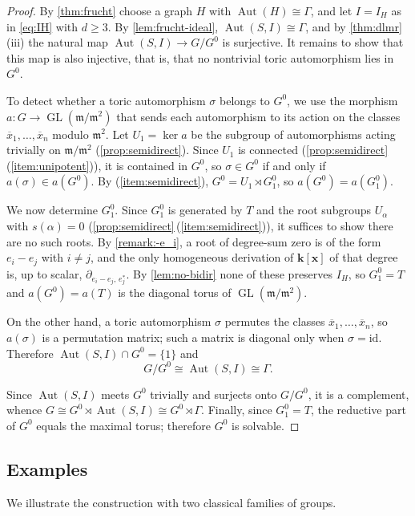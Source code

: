 \documentclass[11pt,letterpaper,reqno]{amsart}
\theoremstyle{remark}
\theoremstyle{definition}
\def\M{\mathfrak{m}}
\def\XX{\mathbf{x}}
\newcommand{\KK}[0]{\ensuremath{\mathbf{k}}}
\newcommand{\Aut}[0]{\ensuremath{\operatorname{Aut}}}
\newcommand{\GL}[0]{\ensuremath{\operatorname{GL}}}
\begin{document}
\begin{proof}
By \cref{thm:frucht} choose a graph $H$ with $\Aut(H)\cong\Gamma$, and let
$I=I_H$ as in \eqref{eq:IH} with $d\geq3$. By \cref{lem:frucht-ideal},
$\Aut(S,I)\cong\Gamma$, and by \cref{thm:dlmr}\,(iii) the natural map
$\Aut(S,I)\to G/G^0$ is surjective. It remains to show that this map is also
injective, that is, that no nontrivial toric automorphism lies in $G^0$.

To detect whether a toric automorphism $\sigma$ belongs to $G^0$, we use the
morphism $a\colon G\to\GL(\M/\M^2)$ that sends each automorphism to its action
on the classes $\overline{x}_1,\dots,\overline{x}_n$ modulo $\M^2$. Let
$U_1 = \ker a$ be the subgroup of automorphisms acting trivially on $\M/\M^2$
(\cref{prop:semidirect}). Since $U_1$ is connected
(\cref{prop:semidirect}\,(\ref{item:unipotent})), it is contained in $G^0$, so
$\sigma\in G^0$ if and only if $a(\sigma)\in a(G^0)$. By
(\ref{item:semidirect}), $G^0 = U_1 \rtimes G_1^0$, so $a(G^0) = a(G_1^0)$.

We now determine $G_1^0$. Since $G_1^0$ is generated by $T$ and the root
subgroups $U_\alpha$ with $s(\alpha)=0$
(\cref{prop:semidirect}\,(\ref{item:semidirect})), it suffices to show there are
no such roots. By \cref{remark:-e_i}, a root of degree-sum zero is of the form $e_i-e_j$ with $i\neq j$, and the only homogeneous derivation of $\KK[\XX]$ of that degree is, up to scalar, $\partial_{e_i-e_j,\,e_j^*}$. By \cref{lem:no-bidir} none of these
preserves $I_H$, so $G_1^0 = T$ and $a(G^0) = a(T)$ is the diagonal torus of
$\GL(\M/\M^2)$.

On the other hand, a toric automorphism $\sigma$ permutes the classes
$\overline{x}_1,\dots,\overline{x}_n$, so $a(\sigma)$ is a permutation matrix;
such a matrix is diagonal only when $\sigma = \mathrm{id}$. Therefore
$\Aut(S,I)\cap G^0 = \{1\}$ and
$$
G/G^0\cong\Aut(S,I)\cong\Gamma.
$$

Since $\Aut(S,I)$ meets $G^0$ trivially and surjects onto $G/G^0$, it is a
complement, whence $G\cong G^0\rtimes\Aut(S,I)\cong G^0\rtimes\Gamma$.
Finally, since $G_1^0 = T$, the reductive part of $G^0$ equals the maximal
torus; therefore $G^0$ is solvable.
\end{proof}

\subsection{Examples}\label{subsec:families}
We illustrate the construction with two classical families of groups.
\end{document}
